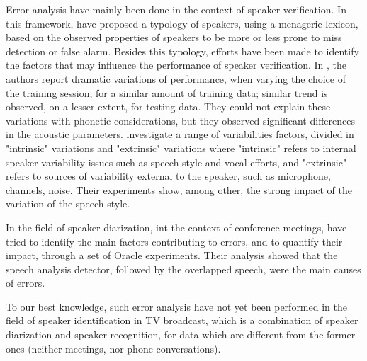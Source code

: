 
Error analysis have mainly been done in the context of speaker verification. In this framework, \cite{doddington98} have proposed a typology of speakers, using a menagerie lexicon, based on the observed properties of speakers to be more or less prone to miss detection or false alarm. Besides this typology, efforts have been made to identify the factors that may influence the performance of speaker verification. In \cite{kahn10}, the authors report dramatic variations of performance, when varying the choice of the training session, for a similar amount of training data; similar trend is observed, on a lesser extent, for testing data. They could not explain these variations with phonetic considerations, but they observed significant differences in the acoustic parameters. \cite{BESTanalysis} investigate a range of variabilities factors, divided in "intrinsic" variations and "extrinsic" variations where "intrinsic" refers to internal speaker variability issues such as speech style and vocal efforts, and "extrinsic" refers to sources of variability external to the speaker, such as microphone, channels, noise. Their experiments show, among other, the strong impact of the variation of the speech style.

In the field of speaker diarization, int the context of conference meetings, \cite{Huijbregts07theblame} have  tried to identify the main factors contributing to errors, and to quantify their impact, through a set of Oracle experiments. Their analysis showed that the speech analysis detector, followed by the overlapped speech, were the main causes of errors.

To our best knowledge, such error analysis have not yet been performed in the field of speaker identification in TV broadcast, which is a combination of speaker diarization and speaker recognition, for data which are different from the former ones (neither meetings, nor phone conversations).